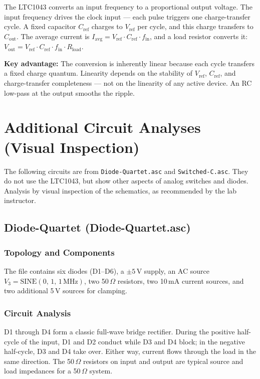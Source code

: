 The LTC1043 converts an input frequency to a proportional output voltage. The input frequency drives the clock input — each pulse triggers one charge-transfer cycle. A fixed capacitor $C_{\text{ref}}$ charges to $V_{\text{ref}}$ per cycle, and this charge transfers to $C_{\text{out}}$. The average current is $I_{\text{avg}} = V_{\text{ref}} \cdot C_{\text{ref}} \cdot f_{\text{in}}$, and a load resistor converts it: $V_{\text{out}} = V_{\text{ref}} \cdot C_{\text{ref}} \cdot f_{\text{in}} \cdot R_{\text{load}}$.

\textbf{Key advantage:} The conversion is inherently linear because each cycle transfers a fixed charge quantum. Linearity depends on the stability of $V_{\text{ref}}$, $C_{\text{ref}}$, and charge-transfer completeness — not on the linearity of any active device. An RC low-pass at the output smooths the ripple.

\section{Additional Circuit Analyses (Visual Inspection)}

The following circuits are from \texttt{Diode-Quartet.asc} and \texttt{Switched-C.asc}. They do not use the LTC1043, but show other aspects of analog switches and diodes. Analysis by visual inspection of the schematics, as recommended by the lab instructor.

\subsection{Diode-Quartet (Diode-Quartet.asc)}

\subsubsection{Topology and Components}

The file contains six diodes (D1--D6), a $\pm 5\,\text{V}$ supply, an AC source $V_3 = \text{SINE}(0,\,1,\,1\,\text{MHz})$, two 50\,$\Omega$ resistors, two 10\,mA current sources, and two additional 5\,V sources for clamping.

\subsubsection{Circuit Analysis}

D1 through D4 form a classic full-wave bridge rectifier. During the positive half-cycle of the input, D1 and D2 conduct while D3 and D4 block; in the negative half-cycle, D3 and D4 take over. Either way, current flows through the load in the same direction. The 50\,$\Omega$ resistors on input and output are typical source and load impedances for a 50\,$\Omega$ system.

